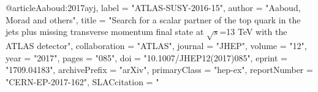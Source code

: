 @article{Aaboud:2017ayj,
      label          = "ATLAS-SUSY-2016-15",
      author         = "Aaboud, Morad and others",
      title          = "{Search for a scalar partner of the top quark in the jets
                        plus missing transverse momentum final state at
                        $\sqrt{s}$=13 TeV with the ATLAS detector}",
      collaboration  = "ATLAS",
      journal        = "JHEP",
      volume         = "12",
      year           = "2017",
      pages          = "085",
      doi            = "10.1007/JHEP12(2017)085",
      eprint         = "1709.04183",
      archivePrefix  = "arXiv",
      primaryClass   = "hep-ex",
      reportNumber   = "CERN-EP-2017-162",
      SLACcitation   = "%
}

